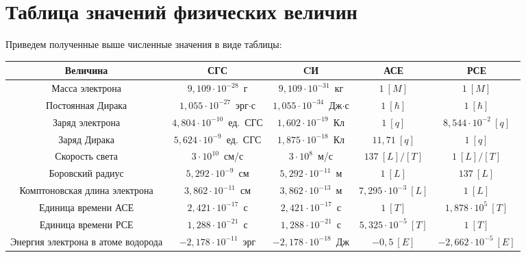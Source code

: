 \section{Таблица значений физических величин}
  Приведем полученные выше численные значения в виде таблицы:
  \begin{table}[h!]
    \center
    \begin{tabular}{|*{5}{C{.18}|}} \hline
        \textbf{Величина} & \textbf{СГС} & \textbf{CИ} & \textbf{АСЕ} &
          \textbf{РСЕ} \\ \hline
        Масса электрона & \( 9,\!109 \cdot 10^{-28} \)~г &
          \( 9,\!109 \cdot 10^{-31} \)~кг & \( 1~[M] \) & \( 1~[M] \) \\ \hline
        Постоянная Дирака & \( 1,\!055 \cdot 10^{-27} \)~эрг\( \cdot \)с &
          \( 1,\!055 \cdot 10^{-34} \)~Дж\( \cdot \)с & \( 1~[\hbar] \) &
          \( 1~[\hbar] \) \\ \hline
        Заряд электрона & \( 4,\!804 \cdot 10^{-10} \)~ед.~СГС &
          \( 1,\!602 \cdot 10^{-19} \)~Кл & \( 1~[q] \) &
          \( 8,\!544 \cdot 10^{-2}~[q] \) \\ \hline
        Заряд Дирака & \( 5,\!624 \cdot 10^{-9} \)~ед.~СГС &
          \( 1,\!875 \cdot 10^{-18} \)~Кл & \( 11,\!71~[q] \) &
          \( 1~[q] \) \\ \hline
        Скорость света & \( 3 \cdot 10^{10} \)~см/с & \( 3 \cdot 10^{8} \)~м/с &
          \( 137~[L]/[T] \) & \( 1~[L]/[T] \) \\ \hline
        Боровский радиус & \( 5,\!292 \cdot 10^{-9} \)~см &
          \( 5,\!292 \cdot 10^{-11} \)~м & \( 1~[L] \) &
          \( 137~[L] \) \\ \hline
        Комптоновская длина электрона & \( 3,\!862 \cdot 10^{-11} \)~см &
          \( 3,\!862 \cdot 10^{-13} \)~м & \( 7,\!295 \cdot 10^{-3}~[L] \) &
          \( 1~[L] \) \\ \hline
        Единица времени АСЕ & \( 2,\!421 \cdot 10^{-17} \)~с &
          \( 2,\!421 \cdot 10^{-17} \)~с & \( 1~[T] \) &
          \( 1,\!878 \cdot 10^5~[T] \) \\ \hline
        Единица времени РСЕ & \( 1,\!288 \cdot 10^{-21} \)~с &
          \( 1,\!288 \cdot 10^{-21} \)~с & \( 5,\!325 \cdot 10^{-5}~[T] \) &
          \( 1~[T] \) \\ \hline
        Энергия электрона в атоме водорода & \( -2,\!178 \cdot 10^{-11} \)~эрг &
          \( -2,\!178 \cdot 10^{-18} \)~Дж & \( -0,\!5~[E] \) &
          \( -2,\!662 \cdot 10^{-5}~[E] \) \\ \hline

\end{tabular}
\end{table}
